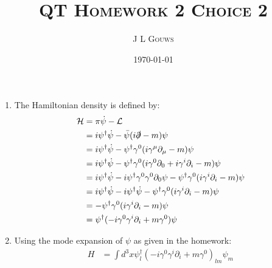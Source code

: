 \documentclass[12pt,a4]{article}
\title{
\textsc{QT Homework 2 Choice 2}
}
\author{\textsc{J L Gouws}
}
\date{\today
\\[1cm]}
\begin{document}
\thispagestyle{empty}

\maketitle


\begin{enumerate}
  \item
    The Hamiltonian density is defined by:
    \begin{align*}
      \mathcal{H} &=  \pi \dot \psi- \mathcal{L}\\
                  &=  i\psi^\dagger \dot \psi- \bar{\psi} (i \slashed{\partial} - m) \psi\\
                  &=  i\psi^\dagger \dot \psi- \psi^\dagger \gamma^0 (i \gamma^\mu \partial_\mu - m) \psi\\
                  &=  i\psi^\dagger \dot \psi- \psi^\dagger \gamma^0 (i\gamma^0\partial_0 + i \gamma^i \partial_i - m) \psi\\
                  &=  i\psi^\dagger \dot \psi- i \psi^\dagger \gamma^0 \gamma^0\partial_0\psi - \psi^\dagger \gamma^0 (i \gamma^i \partial_i - m) \psi\\
                  &=  i\psi^\dagger \dot \psi- i \psi^\dagger \dot\psi - \psi^\dagger \gamma^0 (i \gamma^i \partial_i - m) \psi\\
                  &=  -\psi^\dagger \gamma^0 (i \gamma^i \partial_i - m) \psi\\
                  &=  \psi^\dagger (-i \gamma^0 \gamma^i \partial_i + m\gamma^0 ) \psi
    \end{align*}
  \item
    Using the mode expansion of $\psi$ as given in the homework:
    \begin{align*}
      H &=  \int d^3 x\psi^\dagger_l (-i \gamma^0 \gamma^i \partial_i + m\gamma^0 )_{lm} \psi_m\\

\end{align*}
\end{enumerate}
\end{document}
